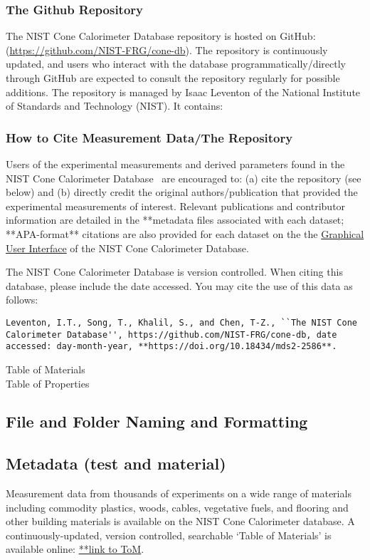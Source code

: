\subsubsection{The Github Repository}
The NIST Cone Calorimeter Database repository is hosted on GitHub: (\url{https://github.com/NIST-FRG/cone-db}). The repository is continuously updated, and users who interact with the database programmatically/directly through GitHub are expected to consult the repository regularly for possible additions. The repository is managed by Isaac Leventon of the National Institute of Standards and Technology (NIST). It contains:

\subsubsection{How to Cite Measurement Data/The Repository}

Users of the experimental measurements and derived parameters found in the NIST Cone Calorimeter Database~\cite{NIST-cone-db} are encouraged to: (a) cite the repository (see below) and (b) directly credit the original authors/publication that provided the experimental measurements of interest. Relevant publications and contributor information are detailed in the **metadata files associated with each dataset; **APA-format** citations are also provided for each dataset on the the \href{www.nist.gov**}{Graphical User Interface} of the NIST Cone Calorimeter Database.

The NIST Cone Calorimeter Database is version controlled. When citing this database, please include the date accessed. You may cite the use of this data as follows:

\begin{lstlisting}
Leventon, I.T., Song, T., Khalil, S., and Chen, T-Z., ``The NIST Cone Calorimeter Database'', https://github.com/NIST-FRG/cone-db, date accessed: day-month-year, **https://doi.org/10.18434/mds2-2586**.
\end{lstlisting}

Table of Materials\\
Table of Properties\\

\subsection{File and Folder Naming and Formatting} \label{ssec:DB-formatting}

\subsection{Metadata (test and material)} \label{ssec:DB-metadata}
Measurement data from thousands of experiments on a wide range of materials including commodity plastics, woods, cables, vegetative fuels, and flooring and other building materials is available on the NIST Cone Calorimeter database. A continuously-updated, version controlled, searchable `Table of Materials' is available online: \href{www.nist.gov}{**link to ToM}.

